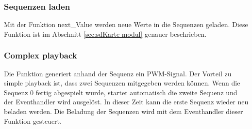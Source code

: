 \subsubsection*{Sequenzen laden}\label{sec:Sequenzen befüllen}
Mit der Funktion next\_Value werden neue Werte in die Sequenzen geladen. Diese Funktion ist im Abschnitt \ref{sec:sdKarte modul} genauer beschrieben.

\subsubsection*{Complex playback}\label{sec:Complex playback}
Die Funktion generiert anhand der Sequenz ein PWM-Signal. Der
Vorteil zu simple playback ist, dass zwei Sequenzen mitgegeben werden können. Wenn die Sequenz 0 fertig abgespielt wurde, startet automatisch die zweite Sequenz und der Eventhandler wird ausgelöst. In dieser Zeit kann die erste Sequenz wieder neu beladen werden. Die Beladung der Sequenzen wird mit dem Eventhandler dieser Funktion gesteuert. 
